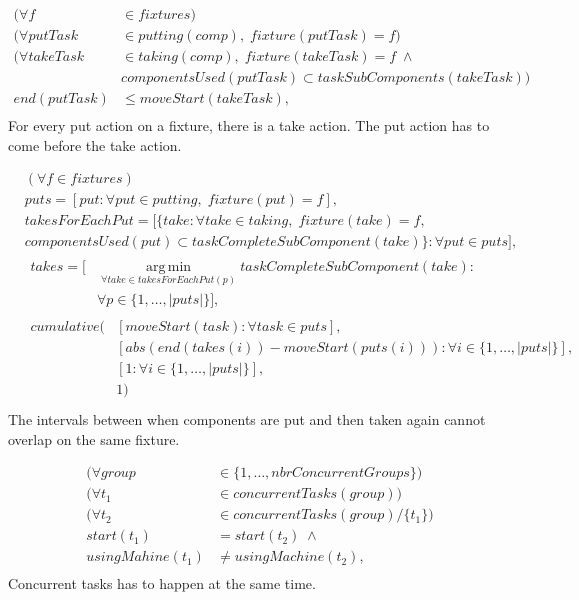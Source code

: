  
 \begin{equation}
 \begin{aligned}\label{eq:99}
 (\forall f &\in fixtures) \\
 (\forall putTask &\in putting(comp), \; fixture(putTask) = f)\\
 (\forall takeTask &\in taking(comp), \; fixture(takeTask) = f \; \land \\
 &componentsUsed(putTask) \subset taskSubComponents(takeTask)) \\
 end(putTask) &\le moveStart(takeTask), \\
 \end{aligned}
 \end{equation}
 For every put action on a fixture, there is a take action. The put action has to come before the take action.
 
 \begin{equation}
 \begin{aligned}\label{eq:100}
 &(\forall f \in fixtures) \\
 &puts = [put : \forall put \in putting, \; fixture(put) = f], \\
 &takesForEachPut = [\{take : \forall take \in taking, \; fixture(take) = f, \\
 &componentsUsed(put) \subset taskCompleteSubComponent(take)\} : \forall put \in puts], \\
 &\begin{aligned}
 takes = [&\operatorname*{arg\,min}_{\forall take \in takesForEachPut(p)}{taskCompleteSubComponent(take)} : \\
 &\forall p \in \{1 , \ldots , |puts|\}], 
 \end{aligned}\\
 &\begin{aligned}
 cumulative(&[moveStart(task) : \forall task \in puts], \\ &[abs(end(takes(i))-moveStart(puts(i))) : \forall i \in \{1 , \ldots , |puts|\}], \\
 &[1 : \forall i \in \{1 , \ldots , |puts|\}],\\
 &1)
 \end{aligned}\\
 \end{aligned}
 \end{equation}
 The intervals between when components are put and then taken again cannot overlap on the same fixture.
 
 \begin{equation}
 \begin{aligned}\label{eq:101}
 (\forall group &\in \{1 , \ldots , nbrConcurrentGroups\}) \\
 (\forall t_1 &\in concurrentTasks(group)) \\
 (\forall t_2 &\in concurrentTasks(group) / \{t_1\}) \\
 start(t_1) &= start(t_2) \; \land \\
 usingMahine(t_1) &\neq usingMachine(t_2), \\
 \end{aligned}
 \end{equation}
 Concurrent tasks has to happen at the same time.
 
